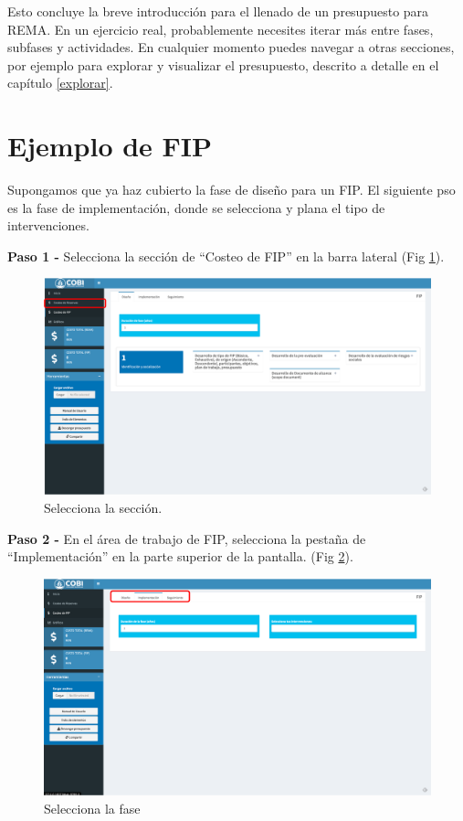 \documentclass[
]{book}
\begin{document}
Esto concluye la breve introducción para el llenado de un presupuesto para REMA. En un ejercicio real, probablemente necesites iterar más entre fases, subfases y actividades. En cualquier momento puedes navegar a otras secciones, por ejemplo para explorar y visualizar el presupuesto, descrito a detalle en el capítulo \ref{explorar}.

\hypertarget{fip}{%
\section{Ejemplo de FIP}\label{fip}}

Supongamos que ya haz cubierto la fase de diseño para un FIP. El siguiente pso es la fase de implementación, donde se selecciona y plana el tipo de intervenciones.

\textbf{Paso 1 - } Selecciona la sección de ``Costeo de FIP'' en la barra lateral (Fig \ref{fig:fip-imp-1}).

\begin{figure}
\centering
\includegraphics{images/fip-imp-1.png}
\caption{\label{fig:fip-imp-1}Selecciona la sección.}
\end{figure}

\textbf{Paso 2 - } En el área de trabajo de FIP, selecciona la pestaña de ``Implementación'' en la parte superior de la pantalla. (Fig \ref{fig:fip-imp-2}).

\begin{figure}
\centering
\includegraphics{images/fip-imp-2.png}
\caption{\label{fig:fip-imp-2}Selecciona la fase}
\end{figure}
\end{document}
